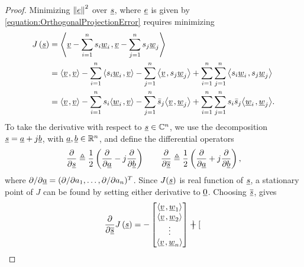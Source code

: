 \begin{proof}
Minimizing $\left\| \underline{e} \right\|^2$ over $\underline{s}$, where $\underline{e}$ is given by \eqref{equation:OrthogonalProjectionError} requires minimizing
\begin{equation*}
\begin{split}
J \left( \underline{s} \right)
&= {\left\langle  \underline{v} - \sum_{i=1}^n s_i \underline{w}_i  \mskip2mu ,  \underline{v} - \sum_{j=1}^n s_j \underline{w}_j  \right\rangle} \\
&= {\left\langle  \underline{v}  \mskip2mu ,  \underline{v}  \right\rangle}
- \sum_{i=1}^n {\left\langle  s_i \underline{w}_i  \mskip2mu ,  \underline{v}  \right\rangle}
- \sum_{j=1}^n {\left\langle  \underline{v}  \mskip2mu ,  s_j \underline{w}_j  \right\rangle}
+ \sum_{i=1}^n \sum_{j=1}^n {\left\langle  s_i \underline{w}_i  \mskip2mu ,  s_j \underline{w}_j  \right\rangle} \\
&= {\left\langle  \underline{v}  \mskip2mu ,  \underline{v}  \right\rangle}
- \sum_{i=1}^n s_i {\left\langle  \underline{w}_i  \mskip2mu ,  \underline{v}  \right\rangle}
- \sum_{j=1}^n \bar{s}_j {\left\langle  \underline{v}  \mskip2mu ,  \underline{w}_j  \right\rangle}
+ \sum_{i=1}^n \sum_{j=1}^n s_i \bar{s}_j {\left\langle  \underline{w}_i  \mskip2mu ,  \underline{w}_j  \right\rangle} .
\end{split}
\end{equation*}
To take the derivative with respect to  $\underline{s}\in \mathbb{C}^n$, we use the decomposition $\underline{s}=\underline{a}+j \underline{b}$, with $\underline{a},\underline{b}\in \mathbb{R}^n$, and define the differential operators
\begin{equation*}
\frac{\partial}{\partial\underline{s}} \triangleq \frac{1}{2}\left(\frac{\partial}{\partial\underline{a}}-j\frac{\partial}{\partial\underline{b}}\right)
\quad \quad
\frac{\partial}{\partial\underline{\overline{s}}} \triangleq \frac{1}{2}\left(\frac{\partial}{\partial\underline{a}}+j\frac{\partial}{\partial\underline{b}}\right),
\end{equation*}
where $\partial/\partial\underline{a} = (\partial/\partial a_1 , \ldots, \partial/\partial a_n )^T$.
Since $J(\underline{s})$ is real function of $\underline{s}$, a stationary point of $J$ can be found by setting either derivative to $\underline{0}$.
Choosing $\underline{\overline{s}}$, gives
\begin{equation*}
\begin{split}
\frac{\partial}{\partial\underline{\overline{s}}} J \left( \underline{s} \right)
&= - \begin{bmatrix}
{\left\langle  \underline{v}  \mskip2mu ,  \underline{w}_1  \right\rangle} \\
{\left\langle  \underline{v}  \mskip2mu ,  \underline{w}_2  \right\rangle} \\
\vdots \\
{\left\langle  \underline{v}  \mskip2mu ,  \underline{w}_n  \right\rangle}
\end{bmatrix}
+ \begin{bmatrix}

\end{bmatrix}
\end{split}
\end{equation*}
\end{proof}
